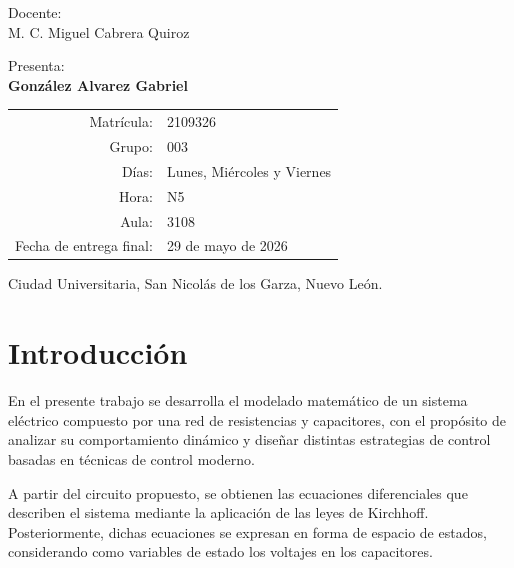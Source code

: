 \documentclass[12pt,letterpaper,twoside]{article}
\begin{document}
\begin{center}
\normalsize{Docente:} \\ 
M. C. Miguel Cabrera Quiroz\\
\end{center}

\begin{center}
    {Presenta:}\\
\large{\textbf{González Alvarez Gabriel}}
\end{center}

\begin{center}
\normalsize
\begin{tabular}{rl}
Matrícula: & 2109326 \\[0.3cm]
Grupo: & 003 \\[0.3cm]
Días: & Lunes, Miércoles y Viernes\\[0.3cm]
Hora: & N5 \\[0.3cm]
Aula: & 3108 \\[0.3cm]
Fecha de entrega final: & 29 de mayo de 2026
\end{tabular}
\end{center}

\vfill

\begin{center}
    {Ciudad Universitaria, San Nicolás de los Garza, Nuevo León.}
\end{center}

\newpage

\tableofcontents
\vfill
\textbf{ }
\vfill

\setcounter{page}{1}
\renewcommand{\labelitemi}{$\checkmark$}

\newpage

\section{Introducción}

En el presente trabajo se desarrolla el modelado matemático de un sistema eléctrico compuesto por una red de resistencias y capacitores, con el propósito de analizar su comportamiento dinámico y diseñar distintas estrategias de control basadas en técnicas de control moderno.

A partir del circuito propuesto, se obtienen las ecuaciones diferenciales que describen el sistema mediante la aplicación de las leyes de Kirchhoff. Posteriormente, dichas ecuaciones se expresan en forma de espacio de estados, considerando como variables de estado los voltajes en los capacitores.
\end{document}
